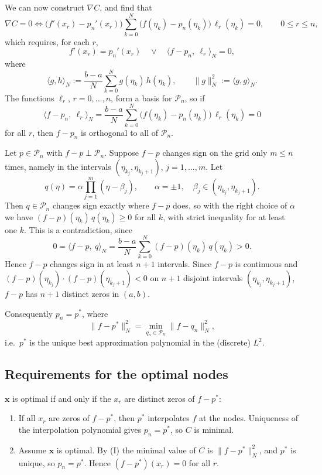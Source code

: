 \documentclass[11pt]{article}
\begin{document}
We can now construct $\nabla C$, and find that
\[
\nabla C = 0 \iff \big(f'(x_r)-p_n'(x_r)\big)\sum_{k=0}^{N}\big(f(\eta_k)-p_n(\eta_k)\big)\,\ell_r(\eta_k) = 0, \qquad 0\le r\le n,
\]
which requires, for each $r$,
\[
f'(x_r) = p_n'(x_r) \quad\lor\quad \langle f-p_n,\ \ell_r\rangle_N = 0,
\]
where
\[
\langle g,h\rangle_N := \frac{b-a}{N}\sum_{k=0}^{N} g(\eta_k)\,h(\eta_k), \qquad \|g\|_N^2 := \langle g,g\rangle_N.
\]
The functions $\ell_r$, $r = 0,\dots,n$, form a basis for $\mathcal{P}_n$, so if
\[
\langle f-p_n,\ \ell_r\rangle_N = \frac{b-a}{N}\sum_{k=0}^{N}\big(f(\eta_k)-p_n(\eta_k)\big)\,\ell_r(\eta_k) = 0
\]
for all $r$, then $f-p_n$ is orthogonal to all of $\mathcal{P}_n$.

\vspace{10mm}
Let $p \in \mathcal{P}_n$ with $f-p \perp \mathcal{P}_n$. Suppose $f-p$ changes sign on the grid only $m \le n$ times, namely in the intervals $(\eta_{k_j},\eta_{k_j+1})$, $j = 1,\dots,m$. Let
\[
q(\eta) = \alpha\prod_{j=1}^{m}(\eta-\beta_j), \qquad \alpha = \pm 1, \quad \beta_j \in (\eta_{k_j},\eta_{k_j+1}).
\]
Then $q \in \mathcal{P}_n$ changes sign exactly where $f-p$ does, so with the right choice of $\alpha$ we have $(f-p)(\eta_k)\,q(\eta_k) \ge 0$ for all $k$, with strict inequality for at least one $k$. This is a contradiction, since
\[
0 = \langle f-p,\ q\rangle_N = \frac{b-a}{N}\sum_{k=0}^{N}(f-p)(\eta_k)\,q(\eta_k) > 0.
\]
Hence $f-p$ changes sign in at least $n+1$ intervals. Since $f-p$ is continuous and $(f-p)(\eta_{k_j})\cdot(f-p)(\eta_{k_j+1}) < 0$ on $n+1$ disjoint intervals $(\eta_{k_j},\eta_{k_j+1})$, $f-p$ has $n+1$ distinct zeros in $(a,b)$.

Consequently $p_n = p^*$, where
\[
\|f-p^*\|_N^2 = \min_{q_n\in\mathcal{P}_n}\|f-q_n\|_N^2,
\]
i.e.\ $p^*$ is the unique best approximation polynomial in the (discrete) $L^2$.

\subsection*{Requirements for the optimal nodes}

$\mathbf{x}$ is optimal if and only if the $x_r$ are distinct zeros of $f-p^*$:
\begin{enumerate}
    \item[(I)] If all $x_r$ are zeros of $f-p^*$, then $p^*$ interpolates $f$ at the nodes. Uniqueness of the interpolation polynomial gives $p_n = p^*$, so $C$ is minimal.
    \item[(II)] Assume $\mathbf{x}$ is optimal. By (I) the minimal value of $C$ is $\|f-p^*\|_N^2$, and $p^*$ is unique, so $p_n = p^*$. Hence $(f-p^*)(x_r) = 0$ for all $r$.
\end{enumerate}
\end{document}
